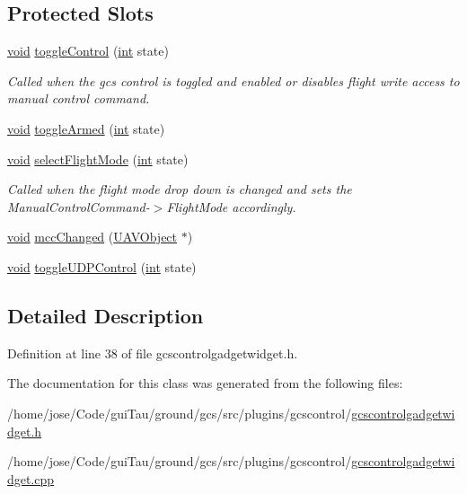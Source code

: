 \subsection*{Protected Slots}
\begin{DoxyCompactItemize}
\item 
\hyperlink{group___u_a_v_objects_plugin_ga444cf2ff3f0ecbe028adce838d373f5c}{void} \hyperlink{group___g_c_s_control_gadget_plugin_gafe60b9408fffe8389ea6b994b3d5c84e}{toggle\-Control} (\hyperlink{ioapi_8h_a787fa3cf048117ba7123753c1e74fcd6}{int} state)
\begin{DoxyCompactList}\small\item\em Called when the gcs control is toggled and enabled or disables flight write access to manual control command. \end{DoxyCompactList}\item 
\hyperlink{group___u_a_v_objects_plugin_ga444cf2ff3f0ecbe028adce838d373f5c}{void} \hyperlink{group___g_c_s_control_gadget_plugin_ga77dc1ed2344ac4440aa6348ee32d3104}{toggle\-Armed} (\hyperlink{ioapi_8h_a787fa3cf048117ba7123753c1e74fcd6}{int} state)
\item 
\hyperlink{group___u_a_v_objects_plugin_ga444cf2ff3f0ecbe028adce838d373f5c}{void} \hyperlink{group___g_c_s_control_gadget_plugin_gab1ae0cb7fd085ad31a9a7b5d6923f8d4}{select\-Flight\-Mode} (\hyperlink{ioapi_8h_a787fa3cf048117ba7123753c1e74fcd6}{int} state)
\begin{DoxyCompactList}\small\item\em Called when the flight mode drop down is changed and sets the Manual\-Control\-Command-\/$>$Flight\-Mode accordingly. \end{DoxyCompactList}\item 
\hyperlink{group___u_a_v_objects_plugin_ga444cf2ff3f0ecbe028adce838d373f5c}{void} \hyperlink{group___g_c_s_control_gadget_plugin_gabdcd9baf431d953b9e2c5f8f2c3d485c}{mcc\-Changed} (\hyperlink{class_u_a_v_object}{U\-A\-V\-Object} $\ast$)
\item 
\hyperlink{group___u_a_v_objects_plugin_ga444cf2ff3f0ecbe028adce838d373f5c}{void} \hyperlink{group___g_c_s_control_gadget_plugin_gaaaa6db9417f6f94567e477ed6b5bd099}{toggle\-U\-D\-P\-Control} (\hyperlink{ioapi_8h_a787fa3cf048117ba7123753c1e74fcd6}{int} state)
\end{DoxyCompactItemize}


\subsection{Detailed Description}


Definition at line 38 of file gcscontrolgadgetwidget.\-h.



The documentation for this class was generated from the following files\-:\begin{DoxyCompactItemize}
\item 
/home/jose/\-Code/gui\-Tau/ground/gcs/src/plugins/gcscontrol/\hyperlink{gcscontrolgadgetwidget_8h}{gcscontrolgadgetwidget.\-h}\item 
/home/jose/\-Code/gui\-Tau/ground/gcs/src/plugins/gcscontrol/\hyperlink{gcscontrolgadgetwidget_8cpp}{gcscontrolgadgetwidget.\-cpp}\end{DoxyCompactItemize}
